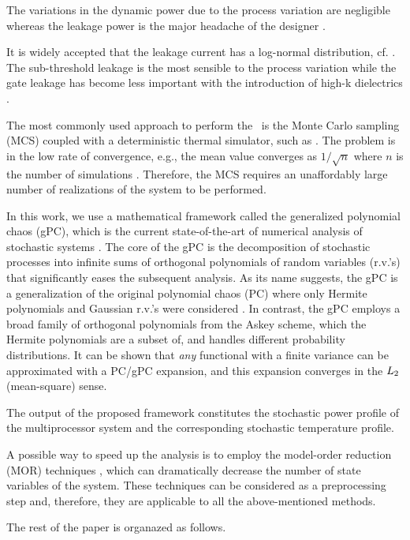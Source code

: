The variations in the dynamic power due to the process variation are negligible whereas the leakage power is the major headache of the designer \cite{juan2012, srivastava2010}.

It is widely accepted that the leakage current has a log-normal distribution, cf. \cite{juan2012, srivastava2010}. The sub-threshold leakage is the most sensible to the process variation while the gate leakage has become less important with the introduction of high-k dielectrics \cite{juan2012}.

The most commonly used approach to perform the \sta\ is the Monte Carlo sampling (MCS) coupled with a deterministic thermal simulator, such as \cite{huang2006}. The problem is in the low rate of convergence, e.g., the mean value converges as $1/\sqrt{n}$ where $n$ is the number of simulations \cite{xiu2009}. Therefore, the MCS requires an unaffordably large number of realizations of the system to be performed.

In this work, we use a mathematical framework called the generalized polynomial chaos (gPC), which is the current state-of-the-art of numerical analysis of stochastic systems \cite{xiu2009, xiu2002}. The core of the gPC is the decomposition of stochastic processes into infinite sums of orthogonal polynomials of random variables (r.v.'s) that significantly eases the subsequent analysis. As its name suggests, the gPC is a generalization of the original polynomial chaos (PC) where only Hermite polynomials and Gaussian r.v.'s were considered \cite{ghanem1991}. In contrast, the gPC employs a broad family of orthogonal polynomials from the Askey scheme, which the Hermite polynomials are a subset of, and handles different probability distributions. It can be shown that \emph{any} functional with a finite variance can be approximated with a PC/gPC expansion, and this expansion converges in the $L_{2}$ (mean-square) sense.

The output of the proposed framework constitutes the stochastic power profile of the multiprocessor system and the corresponding stochastic temperature profile.

A possible way to speed up the analysis is to employ the model-order reduction (MOR) techniques \cite{benner2011}, which can dramatically decrease the number of state variables of the system. These techniques can be considered as a preprocessing step and, therefore, they are applicable to all the above-mentioned methods.

The rest of the paper is organazed as follows.
